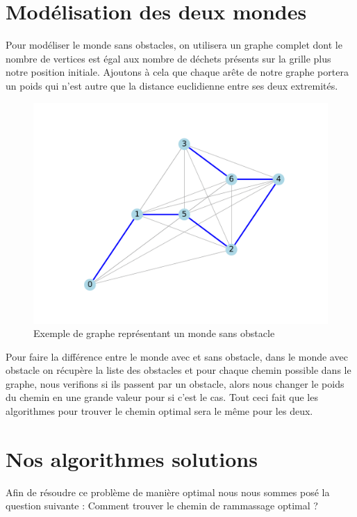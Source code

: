 \documentclass{report}
\begin{document}
\section{\Large Mod\'elisation des deux mondes}
\hspace{0,5 cm} \Large Pour mod\'eliser le monde sans obstacles, on utilisera un graphe complet dont le nombre de vertices est \'egal aux nombre de d\'echets pr\'esents sur la grille plus notre 
position initiale. Ajoutons \`a cela que chaque ar\^ete de notre graphe portera un poids qui n'est autre que la distance euclidienne entre ses deux extremit\'es.
\begin{figure}[!h]
    \centerline{\includegraphics[scale=1]{best_path_arbitrary-1.png}}
    \caption{Exemple de graphe repr\'esentant un monde sans obstacle} 
  \end{figure}

Pour faire la différence entre le monde avec et sans obstacle, dans le monde avec obstacle on récupère la liste des obstacles et pour chaque chemin possible dans le graphe, nous verifions si ils passent par un obstacle, alors nous changer le poids du chemin en une grande valeur pour si c'est le cas. Tout ceci fait que les algorithmes pour trouver le chemin optimal sera le même pour les deux.


\section{Nos algorithmes solutions}

Afin de résoudre ce problème de manière optimal nous nous sommes posé la question suivante : Comment trouver le chemin de rammassage optimal ?
\end{document}
